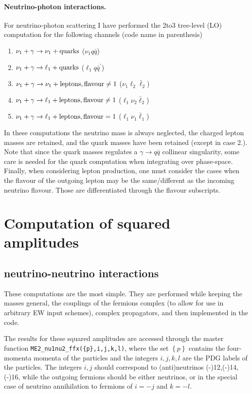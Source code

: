 \documentclass[a4paper,11pt]{article}
\begin{document}
\newpage 
\paragraph{Neutrino-photon interactions.} For neutrino-photon scattering I have performed the 2to3 tree-level (LO) computation for the following channels (code name in parenthesis)
\begin{enumerate}
	\item $\nu_1 + \gamma \to \nu_1 + {\rm quarks}$ ($\nu_1q\bar q$)
	\item $\nu_1 + \gamma \to \ell_1 + {\rm quarks}$ ($\ell_1q\bar q^{\prime}$)
	\item $\nu_1 + \gamma \to \nu_1 + {\rm leptons, flavour\neq1}$ ($\nu_1 \ell_2 \bar\ell_2$)
	\item $\nu_1 + \gamma \to \ell_1 + {\rm leptons, flavour\neq1}$ ($\ell_1 \nu_2 \bar\ell_2$)
	\item $\nu_1 + \gamma \to \ell_1 + {\rm leptons, flavour=1}$ ($\ell_1 \nu_1 \bar\ell_1$)
\end{enumerate}
In these computations the neutrino mass is always neglected, the charged lepton masses are retained, and the quark masses have been retained (except in case 2.). Note that since the quark masses regulates a $\gamma \to q \bar q$ collinear singularity, some care is needed for the quark computation when integrating over phase-space. Finally, when considering lepton production, one must consider the cases when the flavour of the outgoing lepton may be the same/different as the incoming neutrino flavour. Those are differentiated through the flavour subscripts.

\section{Computation of squared amplitudes}

\subsection{neutrino-neutrino interactions}
These computations are the most simple. They are performed while keeping the masses general, the couplings of the fermions complex (to allow for use in arbitrary EW input schemes), complex propagators, and then implemented in the code.

The results for these squared amplitudes are accessed through the master function \verb|ME2_nu1nu2_ffx({p},i,j,k,l)|, where the set $\left\{p\right\}$ contains the four-momenta momenta of the particles and the integers $i,j,k,l$ are the PDG labels of the particles.
%
The integers $i,j$ should correspond to (anti)neutrinos (-)12,(-)14,(-)16, while the outgoing fermions should be either neutrinos, or in the special case of neutrino annihilation to fermions of $i = -j$ and $k = -l$.
\end{document}
